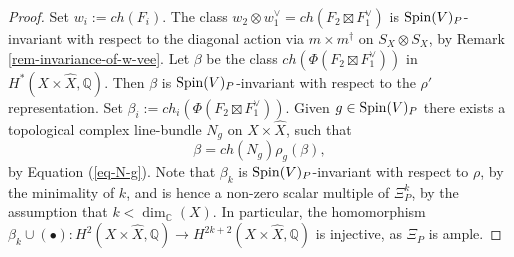 \documentclass[12pt]{amsart}
\numberwithin{equation}{subsection}
\theoremstyle{plain}
\theoremstyle{definition}
\newcommand{\CC}{{\mathbb C}}
\newcommand{\F}{{\mathcal F}}
\newcommand{\QQ}{{\mathbb Q}}
\newcommand{\Spin}{{\rm Spin}}
\begin{document}
\begin{proof}
Set $w_i:=ch(F_i)$. 
The class $w_2\otimes w_1^\vee=ch(F_2\boxtimes F_1^\vee)$ is $\Spin(V)_P$-invariant with respect to the diagonal action via $m\times m^\dagger$ on $S_X\otimes S_X$, by Remark \ref{rem-invariance-of-w-vee}.
Let $\beta$ be the class $ch(\Phi(F_2\boxtimes F_1^\vee))$ in $H^*(X\times\hat{X},\QQ)$. Then $\beta$ is $\Spin(V)_P$-invariant with respect to the $\rho'$ representation.
Set $\beta_i:=ch_i(\Phi(F_2\boxtimes F_1^\vee))$.  
Given $g\in \Spin(V)_P$ there exists a topological complex line-bundle $N_g$ on $X\times \hat{X}$, such that 
\begin{equation}
\label{eq-N-g-beta}
\beta=ch(N_g)\rho_g(\beta),
\end{equation}
by Equation (\ref{eq-N-g}).
Note that $\beta_k$ is $\Spin(V)_P$-invariant with respect to  $\rho$, by the minimality of $k$,  and is hence a non-zero scalar multiple of $\Xi_P^k$, by the assumption that $k<\dim_\CC(X)$. In particular, the homomorphism  $\beta_k\cup(\bullet):H^2(X\times\hat{X},\QQ)\rightarrow H^{2k+2}(X\times\hat{X},\QQ)$ is injective, as $\Xi_P$ is ample.



\end{proof}
\end{document}
